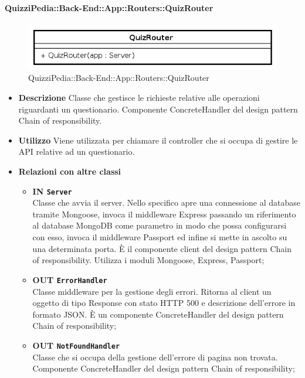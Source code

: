 \paragraph{QuizziPedia::Back-End::App::Routers::QuizRouter}
\label{QuizziPedia::Back-End::App::Routers::QuizRouter}
\begin{figure}[ht]
	\centering
	\includegraphics[scale=0.45]{UML/Classi/Back-End/QuizziPedia_Back-End_App_Routers_quizRouter.png}
	\caption{QuizziPedia::Back-End::App::Routers::QuizRouter}
\end{figure}
\FloatBarrier
	\begin{itemize}
		\item \textbf{Descrizione} 
		Classe che gestisce le richieste relative alle operazioni riguardanti un questionario. Componente ConcreteHandler del design pattern Chain of responsibility.
		\item \textbf{Utilizzo} 
		Viene utilizzata per chiamare il controller che si occupa di gestire le API relative ad un questionario.
		\item \textbf{Relazioni con altre classi} 
		\begin{itemize}
		\item \textbf{IN \texttt{Server}} \\
			Classe che avvia il server. Nello specifico apre una connessione al database tramite Mongoose, invoca il middleware Express passando un riferimento al database MongoDB come parametro in modo che possa configurarsi con esso, invoca il middleware Passport ed infine si mette in ascolto su una determinata porta. È il componente client del design pattern Chain of responsibility. Utilizza i moduli Mongoose, Express, Passport;
		\item \textbf{OUT \texttt{ErrorHandler}} \\
			Classe middleware per la gestione degli errori. Ritorna al client un oggetto di tipo Response con stato HTTP 500 e descrizione dell'errore in formato JSON. È un componente ConcreteHandler del design pattern Chain of responsibility;
		\item \textbf{OUT \texttt{NotFoundHandler}} \\
			Classe che si occupa della gestione dell'errore di pagina non trovata. Componente ConcreteHandler del design pattern Chain of responsibility;

\end{itemize}
\end{itemize}
